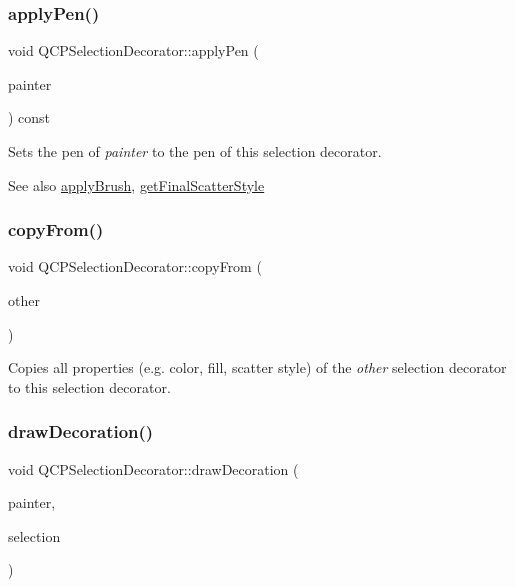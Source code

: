 \subsubsection{\texorpdfstring{apply\+Pen()}{applyPen()}}
{\footnotesize\ttfamily void Q\+C\+P\+Selection\+Decorator\+::apply\+Pen (\begin{DoxyParamCaption}\item[{\hyperlink{class_q_c_p_painter}{Q\+C\+P\+Painter} $\ast$}]{painter }\end{DoxyParamCaption}) const}

Sets the pen of {\itshape painter} to the pen of this selection decorator.

\begin{DoxySeeAlso}{See also}
\hyperlink{class_q_c_p_selection_decorator_a225544527d51b49546b70d0e6d655a34}{apply\+Brush}, \hyperlink{class_q_c_p_selection_decorator_a1277b373248896bc70e8cc1de96da9fa}{get\+Final\+Scatter\+Style} 
\end{DoxySeeAlso}
\mbox{\label{class_q_c_p_selection_decorator_a467a8d5cfcab27e862a17c797ac27b8a}} 
\subsubsection{\texorpdfstring{copy\+From()}{copyFrom()}}
{\footnotesize\ttfamily void Q\+C\+P\+Selection\+Decorator\+::copy\+From (\begin{DoxyParamCaption}\item[{const \hyperlink{class_q_c_p_selection_decorator}{Q\+C\+P\+Selection\+Decorator} $\ast$}]{other }\end{DoxyParamCaption})\hspace{0.3cm}{\ttfamily [virtual]}}

Copies all properties (e.\+g. color, fill, scatter style) of the {\itshape other} selection decorator to this selection decorator. \mbox{\label{class_q_c_p_selection_decorator_a4f8eb49e277063845391e803ae23054a}} 
\subsubsection{\texorpdfstring{draw\+Decoration()}{drawDecoration()}}
{\footnotesize\ttfamily void Q\+C\+P\+Selection\+Decorator\+::draw\+Decoration (\begin{DoxyParamCaption}\item[{\hyperlink{class_q_c_p_painter}{Q\+C\+P\+Painter} $\ast$}]{painter,  }\item[{\hyperlink{class_q_c_p_data_selection}{Q\+C\+P\+Data\+Selection}}]{selection }\end{DoxyParamCaption})\hspace{0.3cm}{\ttfamily [virtual]}}

